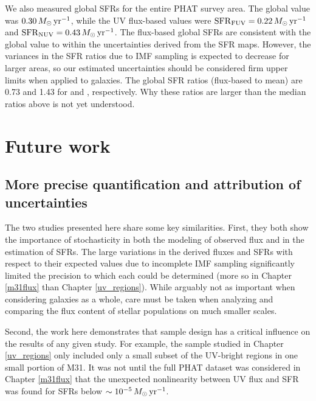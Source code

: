 We also measured global SFRs for the entire PHAT survey area. The global
\sfroneh{} value was $0.30\,M_\odot\,\mathrm{yr}^{-1}$, while the UV flux-based values were
$\mathrm{SFR}_{\mathrm{FUV}} = 0.22\,M_\odot\,\mathrm{yr}^{-1}$ and $\mathrm{SFR}_{\mathrm{NUV}} = 0.43\,M_\odot\,\mathrm{yr}^{-1}$. The flux-based
global SFRs are consistent with the global \sfroneh{} value to within the
uncertainties derived from the SFR maps. However, the variances in the SFR
ratios due to IMF sampling is expected to decrease for larger areas, so our
estimated uncertainties should be considered firm upper limits when applied to
galaxies. The global SFR ratios (flux-based to mean) are 0.73 and 1.43 for
\fuv{} and \nuv{}, respectively. Why these ratios are larger than the median
ratios above is not yet understood.



\section{Future work}

\subsection{More precise quantification and attribution of uncertainties}

The two studies presented here share some key similarities. First, they both
show the importance of stochasticity in both the modeling of observed flux and
in the estimation of SFRs. The large variations in the derived fluxes and SFRs
with respect to their expected values due to incomplete IMF sampling
significantly limited the precision to which each could be determined (more so
in Chapter \ref{m31flux} than Chapter \ref{uv_regions}). While arguably not as
important when considering galaxies as a whole, care must be taken when
analyzing and comparing the flux content of stellar populations on much smaller
scales.

Second, the work here demonstrates that sample design has a critical influence
on the results of any given study. For example, the sample studied in Chapter
\ref{uv_regions} only included only a small subset of the UV-bright regions in
one small portion of M31. It was not until the full PHAT dataset was considered
in Chapter \ref{m31flux} that the unexpected nonlinearity between UV flux and
SFR was found for SFRs below $\sim 10^{-5}\,M_\odot\,\mathrm{yr}^{-1}$.

